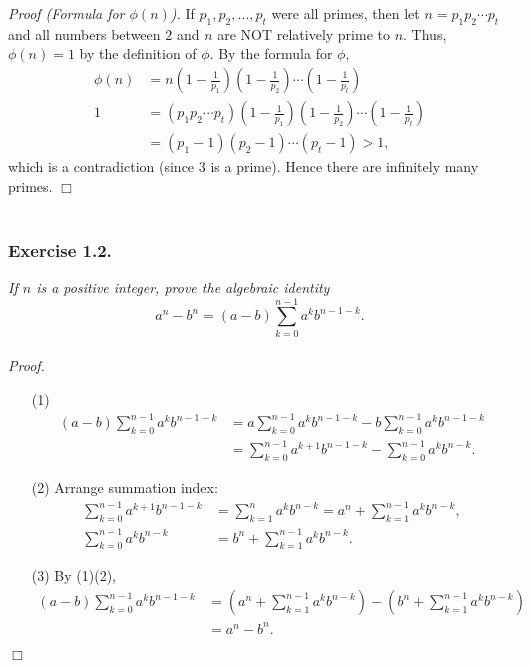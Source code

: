 \documentclass{article}
\begin{document}
\emph{Proof (Formula for $\phi(n)$).}
If
$p_1, p_2, \ldots, p_t$ were all primes, then let
$n = p_1 p_2 \cdots p_t$ and all numbers between $2$ and $n$ are
NOT relatively prime to $n$.
Thus, $\phi(n) = 1$ by the definition of $\phi$.
By the formula for $\phi$,
\begin{align*}
  \phi(n)
  &= n
  \left( 1 - \frac{1}{p_1} \right)
  \left( 1 - \frac{1}{p_2} \right)
  \cdots
  \left( 1 - \frac{1}{p_t} \right) \\
  1
  &= (p_1 p_2 \cdots p_t)
  \left( 1 - \frac{1}{p_1} \right)
  \left( 1 - \frac{1}{p_2} \right)
  \cdots
  \left( 1 - \frac{1}{p_t} \right) \\
  &= (p_1 - 1)(p_2 - 1) \cdots (p_t - 1) > 1,
\end{align*}
which is a contradiction (since $3$ is a prime).
Hence there are infinitely many primes.
$\Box$ \\\\






\subsubsection*{Exercise 1.2.}
\emph{If $n$ is a positive integer, prove the algebraic identity
$$a^n - b^n = (a - b) \sum_{k=0}^{n-1} a^k b^{n-1-k}.$$} \\

\emph{Proof.}
\begin{enumerate}
\item[(1)]
\begin{align*}
(a - b) \sum_{k=0}^{n-1} a^k b^{n-1-k}
&= a \sum_{k=0}^{n-1} a^k b^{n-1-k} - b \sum_{k=0}^{n-1} a^k b^{n-1-k} \\
&= \sum_{k=0}^{n-1} a^{k+1} b^{n-1-k} - \sum_{k=0}^{n-1} a^k b^{n-k}.
\end{align*}
\item[(2)] Arrange summation index:
\begin{align*}
\sum_{k=0}^{n-1} a^{k+1} b^{n-1-k}
&= \sum_{k=1}^{n} a^{k} b^{n-k}
= a^n + \sum_{k=1}^{n-1} a^{k} b^{n-k}, \\
\sum_{k=0}^{n-1} a^k b^{n-k}
&= b^n + \sum_{k=1}^{n-1} a^{k} b^{n-k}.
\end{align*}
\item[(3)]
By (1)(2),
\begin{align*}
(a - b) \sum_{k=0}^{n-1} a^k b^{n-1-k}
&= \left( a^n + \sum_{k=1}^{n-1} a^{k} b^{n-k} \right)
- \left( b^n + \sum_{k=1}^{n-1} a^{k} b^{n-k} \right) \\
&= a^n - b^n.
\end{align*}
\end{enumerate}
$\Box$ \\
\end{document}
